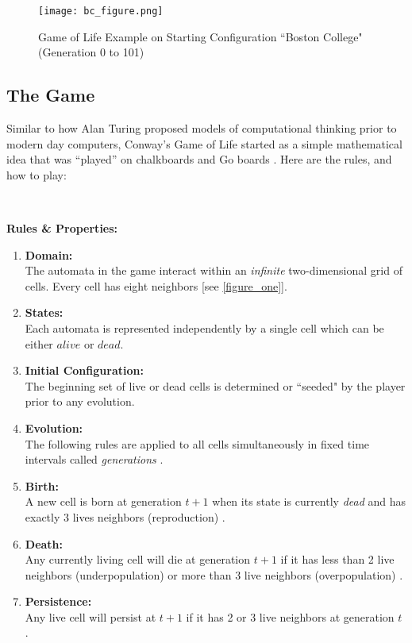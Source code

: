 \documentclass{article}
\theoremstyle{definition}
\theoremstyle{plain}
\theoremstyle{plain}
\begin{document}
 \begin{figure}[ht]
          \centering
    \texttt{[image: bc\_figure.png]}
    \caption{Game of Life Example on Starting Configuration ``Boston College" (Generation 0 to 101)}
\end{figure}



\subsection{The Game}
Similar to how Alan Turing proposed models of computational thinking prior to modern day computers, Conway's Game of Life started as a simple mathematical idea that was “played” on chalkboards and Go boards \cite{Izhikevich_Conway_Seth}. Here are the rules, and how to play: 

\

\textbf{Rules \& Properties: }
\begin{enumerate}
  \label{rules}
  \item \textbf{Domain: }\\ The automata in the game interact within an \textit{infinite} two-dimensional grid of cells. Every cell has eight neighbors \cite{Izhikevich_Conway_Seth}[see \ref{figure_one}]. \label{rule_one}

  \item \textbf{States: }\\ Each automata is represented independently by a single cell which can be either $\textit{alive}$ or $\textit{dead}$.

  \item \textbf{Initial Configuration: } \\ The beginning set of live or dead cells is determined or ``seeded" by the player prior to any evolution.

  \item \textbf{Evolution: } \\ The following rules are applied to all cells simultaneously in fixed time intervals called \textit{generations} \cite{Bontes2019}.

  \item \textbf{Birth: } \\ A new cell is born at generation $t + 1$ when its state is currently \textit{dead} and has exactly 3 lives neighbors (reproduction) \cite{Bontes2019}.

  \item \textbf{Death: } \\ Any currently living cell will die at generation $t + 1$ if it has less than 2 live neighbors (underpopulation) or more than 3 live neighbors (overpopulation) \cite{Bontes2019}.

  \item \textbf{Persistence: } \\ Any live cell will persist at $t + 1$ if it has 2 or 3 live neighbors at generation $t$ \cite{Izhikevich_Conway_Seth}.
\end{enumerate}
\end{document}
